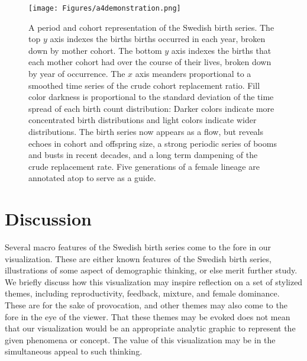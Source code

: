 \documentclass{article}
\begin{document}
\begin{figure}
\texttt{[image: Figures/a4demonstration.png]}
\caption{A period and cohort representation of the Swedish birth series. The top $y$ axis indexes the births births occurred in each year, broken down by mother cohort. The bottom $y$ axis indexes the births that each mother cohort had over the course of their lives, broken down by year of occurrence. The $x$ axis meanders proportional to a smoothed time series of the crude cohort replacement ratio. Fill color darkness is proportional to the standard deviation of the time spread of each birth count distribution: Darker colors indicate more concentrated birth distributions and light colors indicate wider distributions. The birth series now appears as a flow, but reveals echoes in cohort and offspring size, a strong periodic series of booms and busts in recent decades, and a long term dampening of the crude replacement rate. Five generations of a female lineage are annotated atop to serve as a guide.}
\label{fig:foldout}
\end{figure}

\section{Discussion}
\label{sec:disc}
Several macro features of the Swedish birth series come to the fore in our visualization. These are either known features of the Swedish birth series, illustrations of some aspect of demographic thinking, or else merit further study. We briefly discuss how this visualization may inspire reflection on a set of stylized themes, including reproductivity, feedback, mixture, and female dominance. These are for the sake of provocation, and other themes may also come to the fore in the eye of the viewer. That these themes may be evoked does not mean that our visualization would be an appropriate analytic graphic to represent the given phenomena or concept. The value of this visualization may be in the simultaneous appeal to such thinking.
\end{document}
